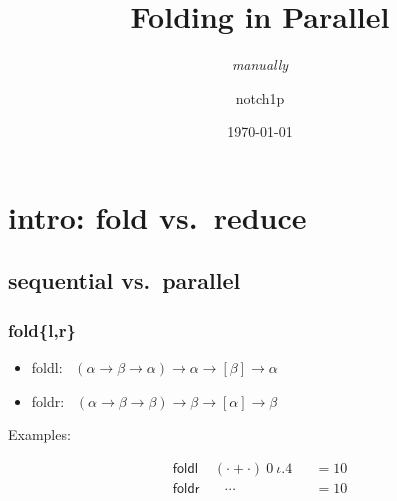 \documentclass{beamer}
\title{Folding in Parallel}
\subtitle{\textit{manually}}
\date{\today}
\author{notch1p}
\begin{document}
\frame{\titlepage}
\section{intro: fold vs.\ reduce}
\subsection{sequential vs.\ parallel}
\begin{frame}
    \frametitle{fold\{l,r\}}
    \begin{itemize}
        \item \textsf{foldl}: \ $(\alpha\to\beta\to\alpha)\to\alpha\to[\beta]\to\alpha$
        \item \textsf{foldr}: \ $(\alpha\to\beta\to\beta)\to\beta\to[\alpha]\to\beta$
    \end{itemize}

    Examples:

    \begin{align*}
        \mathsf{foldl} & \ (\cdot + \cdot)\ 0\ \iota.4 &  & = 10 \\
        \mathsf{foldr} & \quad \cdots                  &  & = 10
    \end{align*}

\end{frame}
\end{document}
